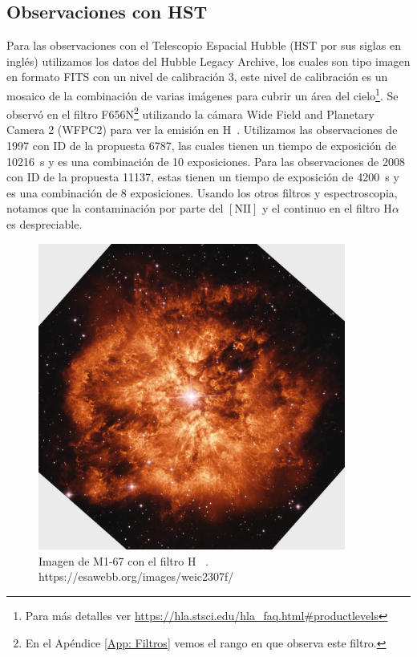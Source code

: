 \documentclass{book}
\begin{document}
\subsection{Observaciones con HST}

Para las observaciones con el Telescopio Espacial Hubble (HST por sus siglas en inglés) utilizamos los datos del Hubble Legacy Archive, los cuales son tipo imagen en formato FITS con un nivel de calibración 3, este nivel de calibración es un mosaico de la combinación de varias imágenes para cubrir un área del cielo\footnote{Para más detalles ver \url{https://hla.stsci.edu/hla_faq.html\#productlevels}}.  Se observó en el filtro F656N\footnote{En el Apéndice \ref{App: Filtros} vemos el rango en que observa este filtro.} utilizando la cámara Wide Field and Planetary Camera 2 (WFPC2) para ver la emisión en \unit{H\alpha}. Utilizamos las observaciones de 1997 con ID de la propuesta 6787, las cuales tienen un tiempo de exposición de \SI{10 216}{s} y es una combinación de 10 exposiciones. Para las observaciones de 2008 con ID de la propuesta 11137, estas tienen un tiempo de exposición de \SI{4200}{s} y es una combinación de 8 exposiciones. Usando los otros filtros y espectroscopia, notamos que la contaminación por parte del $[\mathrm{N\scriptstyle{II}}]$ y el continuo en el filtro H$\alpha$ es despreciable.

\begin{figure}[htb]
    \centering
    \includegraphics[width=0.9\textwidth]{m1-67-comp-full-hst.jpg}
    \caption{Imagen de M1-67 con el filtro \unit{H\alpha} \citep{Grosdidier:1998}. https://esawebb.org/images/weic2307f/}
    \label{fig:M1-67HST}
\end{figure}
\end{document}
